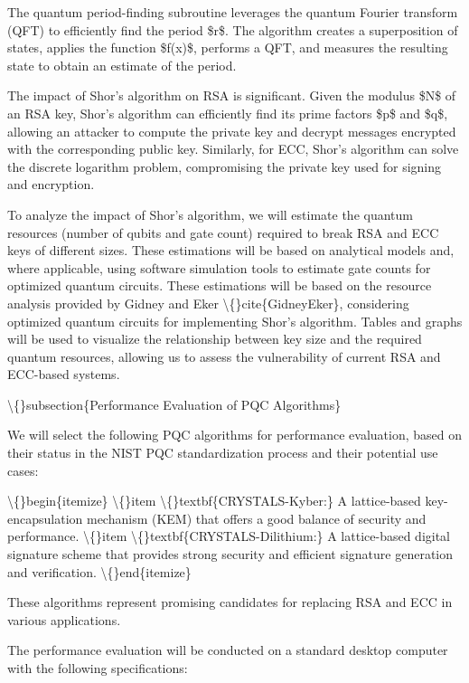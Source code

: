 \documentclass{article}
\begin{document}
The quantum period-finding subroutine leverages the quantum Fourier transform (QFT) to efficiently find the period \$r\$. The algorithm creates a superposition of states, applies the function \$f(x)\$, performs a QFT, and measures the resulting state to obtain an estimate of the period.

The impact of Shor's algorithm on RSA is significant. Given the modulus \$N\$ of an RSA key, Shor's algorithm can efficiently find its prime factors \$p\$ and \$q\$, allowing an attacker to compute the private key and decrypt messages encrypted with the corresponding public key. Similarly, for ECC, Shor's algorithm can solve the discrete logarithm problem, compromising the private key used for signing and encryption.

To analyze the impact of Shor's algorithm, we will estimate the quantum resources (number of qubits and gate count) required to break RSA and ECC keys of different sizes. These estimations will be based on analytical models and, where applicable, using software simulation tools to estimate gate counts for optimized quantum circuits.  These estimations will be based on the resource analysis provided by Gidney and Eker \textbackslash\{\}cite\{GidneyEker\}, considering optimized quantum circuits for implementing Shor's algorithm. Tables and graphs will be used to visualize the relationship between key size and the required quantum resources, allowing us to assess the vulnerability of current RSA and ECC-based systems.

\textbackslash\{\}subsection\{Performance Evaluation of PQC Algorithms\}

We will select the following PQC algorithms for performance evaluation, based on their status in the NIST PQC standardization process and their potential use cases:

\textbackslash\{\}begin\{itemize\}
    \textbackslash\{\}item \textbackslash\{\}textbf\{CRYSTALS-Kyber:\} A lattice-based key-encapsulation mechanism (KEM) that offers a good balance of security and performance.
    \textbackslash\{\}item \textbackslash\{\}textbf\{CRYSTALS-Dilithium:\} A lattice-based digital signature scheme that provides strong security and efficient signature generation and verification.
\textbackslash\{\}end\{itemize\}

These algorithms represent promising candidates for replacing RSA and ECC in various applications.

The performance evaluation will be conducted on a standard desktop computer with the following specifications:
\end{document}
